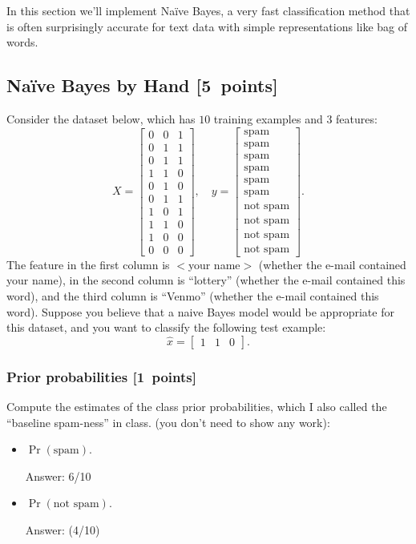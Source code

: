 \documentclass{article}
\newcommand{\blu}[1]{{\textcolor{blu}{#1}}}
\newcommand{\gre}[1]{\textcolor{gre}{#1}}
\newcommand\ans[1]{\par\gre{Answer: #1}}
\let\ask\blu
\newcommand\pts[1]{\textcolor{pointscolour}{[#1~points]}}
\begin{document}
    In this section we'll implement Na\"ive Bayes, a very fast classification method that is often surprisingly accurate for text data with simple representations like bag of words.


    \subsection{Na\"ive Bayes by Hand \pts{5}}

    Consider the dataset below, which has $10$ training examples and $3$ features:
    \[
    X = \begin{bmatrix}
        0 & 0 & 1\\
        0 & 1 & 1\\
        0 & 1 & 1\\
        1 & 1 & 0\\
        0 & 1 & 0\\
        0 & 1 & 1\\
        1 & 0 & 1\\
        1 & 1 & 0\\
        1 & 0 & 0\\
        0 & 0 & 0
    \end{bmatrix},
    \quad y = \begin{bmatrix}
        \text{spam}\\
        \text{spam}\\
        \text{spam}\\
        \text{spam}\\
        \text{spam}\\
        \text{spam}\\
        \text{not spam}\\
        \text{not spam}\\
        \text{not spam}\\
        \text{not spam}
    \end{bmatrix}.
    \]
    The feature in the first column is $<$your name$>$ (whether the e-mail contained your name), in the second column is ``lottery'' (whether the e-mail contained this word), and the third column is ``Venmo'' (whether the e-mail contained this word).
    Suppose you believe that a naive Bayes model would be appropriate for this dataset, and you want to classify the following test example:
    \[
    \hat{x} = \begin{bmatrix}1 & 1 & 0\end{bmatrix}.
    \]
    \subsubsection{Prior probabilities \pts{1}}
    \ask{Compute the estimates of the class prior probabilities, which I also called the ``baseline spam-ness'' in class.} (you don't need to show any work):
    \begin{itemize}
        \item $\Pr(\text{spam})$.
        \ans{6/10}
        \item $\Pr(\text{not spam})$.
        \ans(4/10)
    \end{itemize}
\end{document}
